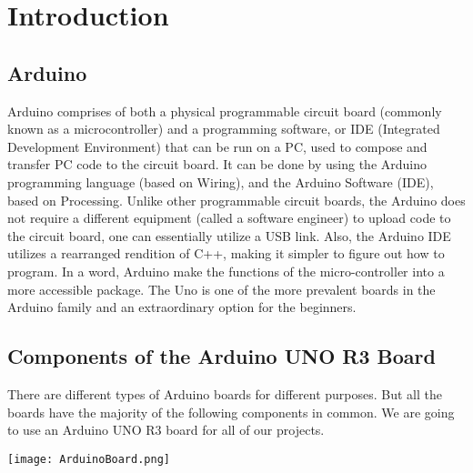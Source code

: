 \pagebreak\section{Introduction}
    \subsection{Arduino}
    Arduino comprises of both a physical programmable circuit board (commonly known as a microcontroller) and a programming software, or IDE (Integrated Development Environment) that can be run
    on a PC, used to compose and transfer PC code to the circuit board. It can be done by using the
    Arduino programming language (based on Wiring), and the Arduino Software (IDE), based on Processing. Unlike other programmable circuit boards, the Arduino does not require a different equipment
    (called a software engineer) to upload code to the circuit board, one can essentially utilize a USB link.
    Also, the Arduino IDE utilizes a rearranged rendition of C++, making it simpler to figure out how
    to program. In a word, Arduino make the functions of the micro-controller into a more accessible
    package. The Uno is one of the more prevalent boards in the Arduino family and an extraordinary
    option for the beginners.
    
    \subsection{Components of the Arduino UNO R3 Board}
    There are different types of Arduino boards for different purposes. But all the boards have the majority of the following components in common. We are going to use an Arduino UNO R3 board for all of our projects.
      
            \begin{center}
                \texttt{[image: ArduinoBoard.png]}
            \end{center}
      

